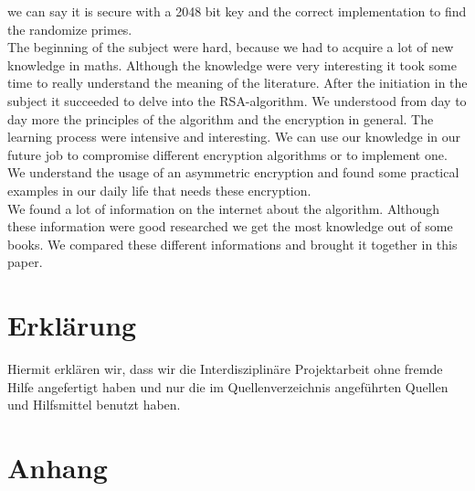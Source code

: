 we can say it is secure with a 2048 bit key and the correct implementation to find the randomize primes. \\
The beginning of the subject were hard, because we had to acquire a lot of new knowledge in maths. Although the knowledge were very interesting it took some time to really understand the meaning of the literature. After the initiation in the subject it succeeded to delve into the RSA-algorithm. %
We understood from day to day more the principles of the algorithm and the encryption in general. The learning process were intensive and interesting. We can use our knowledge in our future job to compromise different encryption algorithms or to implement one. We understand the usage of an asymmetric encryption and found some practical examples in our daily life that needs these encryption.\\ 
We found a lot of information on the internet about the algorithm. Although these information were good researched we get the most knowledge out of some books. We compared these different informations and brought it together in this paper.
\newpage
\section{Erklärung}
Hiermit erklären wir, dass wir die Interdisziplinäre Projektarbeit ohne fremde Hilfe angefertigt haben und nur die im Quellenverzeichnis angeführten Quellen und Hilfsmittel benutzt haben.
\newpage
\section{Anhang}
\listoffigures
%

